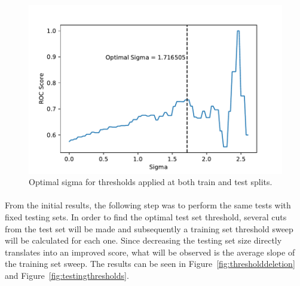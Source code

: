 \documentclass[12pt,a4paper]{report}
\begin{document}
\begin{figure}[b]
        \includegraphics[width=\textwidth]{imgs/Sigma_figure.pdf}
        \caption{Optimal sigma for thresholds applied at both train and test splits.}
        \label{fig:Sigma ROC Sigma}
    \end{figure}

\paragraph{} From the initial results, the following step was to perform the same tests with fixed testing sets. In order to find the optimal test set threshold, several cuts from the test set will be made and subsequently a training set threshold sweep will be calculated for each one. Since decreasing the testing set size directly translates into an improved score, what will be observed is the average slope of the training set sweep. The results can be seen in Figure~\ref{fig:thresholddeletion} and Figure~\ref{fig:testingthresholds}.
\end{document}
